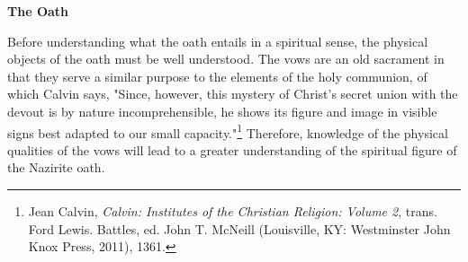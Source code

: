 \documentclass[12pt]{turabian-researchpaper}
\begin{document}
\begin{center}
\textbf{The Oath}
\end{center}
\par
Before understanding what the oath entails in a spiritual sense, the physical objects of the oath must be well understood. 
The vows are an old sacrament in that they serve a similar purpose to the elements of the holy communion, of which Calvin says, "Since, however, this mystery of Christ's secret union with the devout is by nature incomprehensible, he shows its figure and image in visible signs best adapted to our small capacity."\footnote{Jean Calvin, \textit{Calvin: Institutes of the Christian Religion: Volume 2}, trans. Ford Lewis. Battles, ed. John T. McNeill (Louisville, KY: Westminster John Knox Press, 2011), 1361.} 
Therefore, knowledge of the physical qualities of the vows will lead to a greater understanding of the spiritual figure of the Nazirite oath. 
\end{document}
